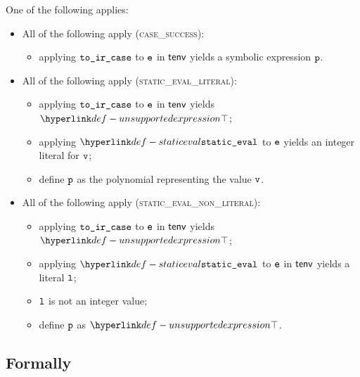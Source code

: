 One of the following applies:
\begin{itemize}
  \item All of the following apply (\textsc{case\_success}):
  \begin{itemize}
    \item applying $\texttt{to\_ir\_case}$ to $\texttt{e}$ in $\textsf{tenv}$ yields a symbolic expression $\texttt{p}$.
  \end{itemize}

  \item All of the following apply (\textsc{static\_eval\_literal}):
  \begin{itemize}
    \item applying $\texttt{to\_ir\_case}$ to $\texttt{e}$ in $\textsf{tenv}$ yields $\CannotBeTransformed$;
    \item applying $\staticeval$ to $\texttt{e}$ yields an integer literal for $\texttt{v}$\ProseTerminateAs{\CannotBeTransformed};
    \item define $\texttt{p}$ as the polynomial representing the value $\texttt{v}$.
  \end{itemize}

  \item All of the following apply (\textsc{static\_eval\_non\_literal}):
  \begin{itemize}
    \item applying $\texttt{to\_ir\_case}$ to $\texttt{e}$ in $\textsf{tenv}$ yields $\CannotBeTransformed$;
    \item applying $\staticeval$ to $\texttt{e}$ in $\textsf{tenv}$ yields a literal $\texttt{l}$\ProseTerminateAs{\CannotBeTransformed};
    \item $\texttt{l}$ is not an integer value;
    \item define $\texttt{p}$ as $\CannotBeTransformed$.
  \end{itemize}
\end{itemize}
\subsection{Formally}
